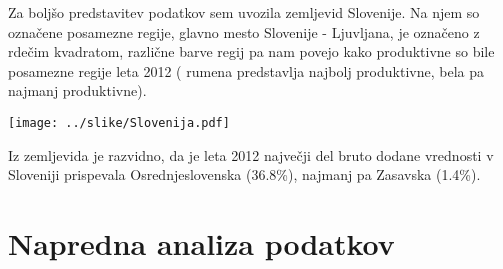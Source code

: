 \documentclass[a4paper, 11pt]{article}
\begin{document}
Za boljšo predstavitev podatkov sem uvozila zemljevid Slovenije. Na njem so označene posamezne regije, glavno mesto Slovenije - Ljuvljana, je označeno z rdečim kvadratom, različne barve regij pa nam povejo kako produktivne so bile posamezne regije leta 2012 ( rumena predstavlja najbolj produktivne, bela pa najmanj produktivne).

\newpage
\begin{center}
\texttt{[image: ../slike/Slovenija.pdf]}
\end{center}

Iz zemljevida je razvidno, da je leta 2012 največji del bruto dodane vrednosti v Sloveniji prispevala Osrednjeslovenska (36.8\%), najmanj pa Zasavska (1.4\%).


\section{Napredna analiza podatkov}
\end{document}
